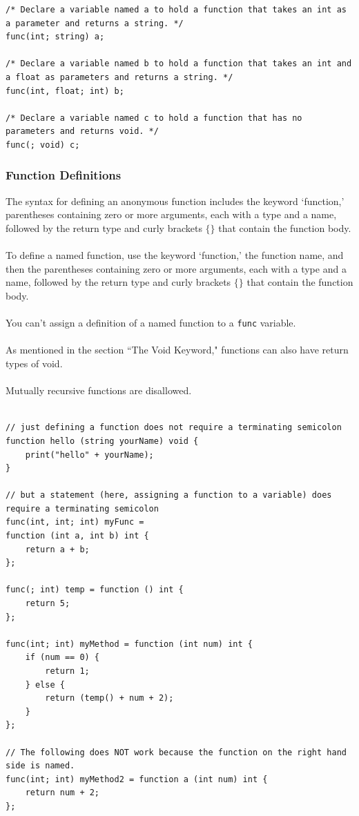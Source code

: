 \documentclass[12pt]{article}
\begin{document}
\begin{lstlisting}
/* Declare a variable named a to hold a function that takes an int as a parameter and returns a string. */
func(int; string) a;

/* Declare a variable named b to hold a function that takes an int and a float as parameters and returns a string. */
func(int, float; int) b;

/* Declare a variable named c to hold a function that has no parameters and returns void. */
func(; void) c;
\end{lstlisting}

\subsubsection{Function Definitions}
The syntax for defining an anonymous function includes the keyword `function,' parentheses containing zero or more arguments, each with a type and a name, followed by the return type and curly brackets $\{ \}$ that contain the function body.
\\ \\
To define a named function, use the keyword `function,' the function name, and then the parentheses containing zero or more arguments, each with a type and a name, followed by the return type and curly brackets $\{ \}$ that contain the function body.
\\ \\
You can't assign a definition of a named function to a \lstinline!func! variable.
\\ \\
As mentioned in the section ``The Void Keyword," functions can also have return types of void. \\
\\
Mutually recursive functions are disallowed. \\

\begin{lstlisting}

// just defining a function does not require a terminating semicolon
function hello (string yourName) void {
    print("hello" + yourName);
}

// but a statement (here, assigning a function to a variable) does require a terminating semicolon
func(int, int; int) myFunc = 
function (int a, int b) int {
    return a + b;
};

func(; int) temp = function () int {
	return 5;
};

func(int; int) myMethod = function (int num) int {
    if (num == 0) {
        return 1;
    } else {
        return (temp() + num + 2);
    }
};

// The following does NOT work because the function on the right hand side is named.
func(int; int) myMethod2 = function a (int num) int {
    return num + 2;
};
\end{lstlisting}
 
\end{document}
